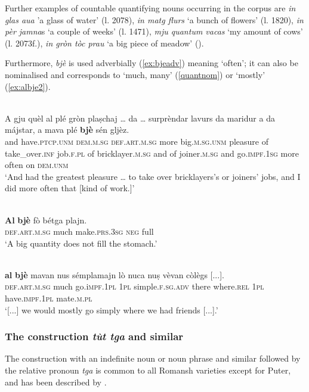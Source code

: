 Further examples of countable quantifying nouns occurring in the corpus are \textit{in glas aua} 'a glass of water' (l. 2078), \textit{in matg flurs} `a bunch of flowers' (l. 1820), \textit{in pèr jamna}s `a couple of weeks' (l. 1471), \textit{mju quantum vacas} `my amount of cows' (l. 2073f.), \textit{in gròn tòc prau} `a big piece of meadow' (\citet[121]{Büchli1966}).

Furthermore, \textit{bjè} is used adverbially (\ref{ex:bjeadv}) meaning `often'; it can also be nominalised and corresponds to `much, many' (\ref{quantnom}) or `mostly' (\ref{ex:albje2}).

\ea
\label{ex:bjeadv}
\\
\gll    A gju quèl al plé gròn plaṣchaj … da … surprèndar lavurs da maridur a da májstar, a mava plé \textbf{bjè} sén gljèz.\\
and have.\textsc{ptcp.unm} \textsc{dem.m.sg} \textsc{def.art.m.sg} more big.\textsc{m.sg.unm} pleasure {} of {} take\_over.\textsc{inf} job.\textsc{f.pl} of bricklayer.\textsc{m.sg} and of joiner.\textsc{m.sg} and  go.\textsc{impf.1sg} more often on \textsc{dem.unm}\\
\glt `And had the greatest pleasure … to take over bricklayers’s or joiners’ jobs, and I did more often that [kind of work.]'
\z

\ea\label{quantnom}
\\
\gll    \textbf{Al} \textbf{bjè} fò bétga plajn.\\
     \textsc{def.art.m.sg} much make.\textsc{prs.3sg} \textsc{neg} full\\
\glt `A big quantity does not fill the stomach.'
\z

\ea
\label{ex:albje2}
\\
	\gll [...] \textbf{al} \textbf{bjè} mavan nus sémplamajn lò nuca nuṣ vèvan còlègs [...].\\
{} \textsc{def.art.m.sg} much go.i\textsc{mpf.1pl} \textsc{1pl} simple.\textsc{f.sg.adv} there where.\textsc{rel} \textsc{1pl} have.\textsc{impf.1pl} mate.\textsc{m.pl}\\
\glt `[...] we would mostly go simply where we had friends [...].'
\z




\subsubsection{The construction \textit{tùt tga} and similar}
The construction with an indefinite noun or noun phrase and similar followed by the relative pronoun \textit{tga} is common to all Romansh varieties except for Puter, and has been described by \citet[185-204]{Linder1987}.

